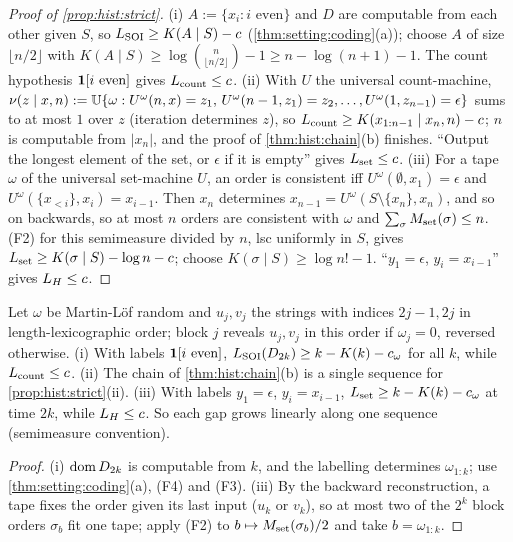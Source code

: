 \begin{proof}[Proof of \cref{prop:hist:strict}]
(i) $A:=\{x_i:i\text{ even}\}$ and $D$ are computable from each other given $S$, so $L_{\mathrm{SOI}}\ge K(A\mid S)-c$ (\cref{thm:setting:coding}(a)); choose $A$ of size $\lfloor n/2\rfloor$ with $K(A\mid S)\ge\log\binom n{\lfloor n/2\rfloor}-1\ge n-\log(n+1)-1$. The count hypothesis $\mathbf{1}[i\text{ even}]$ gives $L_{\rm count}\le c$.
(ii) With $U$ the universal count-machine, $\nu(z\mid x,n):=\mathbb{U}\{\omega:U^\omega(n,x)=z_1,\,U^\omega(n-1,z_1)=z_2,\dots,U^\omega(1,z_{n-1})=\epsilon\}$ sums to at most $1$ over $z$ (iteration determines $z$), so $L_{\rm count}\ge K(x_{1:n-1}\mid x_n,n)-c$; $n$ is computable from $|x_n|$, and the proof of \cref{thm:hist:chain}(b) finishes. ``Output the longest element of the set, or $\epsilon$ if it is empty'' gives $L_{\rm set}\le c$.
(iii) For a tape $\omega$ of the universal set-machine $U$, an order is consistent iff $U^\omega(\emptyset,x_1)=\epsilon$ and $U^\omega(\{x_{<i}\},x_i)=x_{i-1}$. Then $x_n$ determines $x_{n-1}=U^\omega(S\setminus\{x_n\},x_n)$, and so on backwards, so at most $n$ orders are consistent with $\omega$ and $\sum_\sigma M_{\mathrm{set}}(\sigma)\le n$. (F2) for this semimeasure divided by $n$, lsc uniformly in $S$, gives $L_{\rm set}\ge K(\sigma\mid S)-\log n-c$; choose $K(\sigma\mid S)\ge\log n!-1$. ``$y_1=\epsilon$, $y_i=x_{i-1}$'' gives $L_{H}\le c$.
\end{proof}

\begin{proposition}\label{prop:hist:strictinf}
Let $\omega$ be Martin-L\"of random and $u_j,v_j$ the strings with indices $2j-1,2j$ in length-lexicographic order; block $j$ reveals $u_j,v_j$ in this order if $\omega_j=0$, reversed otherwise. (i) With labels $\mathbf{1}[i\text{ even}]$, $L_{\mathrm{SOI}}(D_{2k})\ge k-K(k)-c_\omega$ for all $k$, while $L_{\rm count}\le c$. (ii) The chain of \cref{thm:hist:chain}(b) is a single sequence for \cref{prop:hist:strict}(ii). (iii) With labels $y_1=\epsilon$, $y_i=x_{i-1}$, $L_{\rm set}\ge k-K(k)-c_\omega$ at time $2k$, while $L_{H}\le c$. So each gap grows linearly along one sequence (semimeasure convention).
\end{proposition}

\begin{proof}
(i) $\operatorname{dom} D_{2k}$ is computable from $k$, and the labelling determines $\omega_{1:k}$; use \cref{thm:setting:coding}(a), (F4) and (F3). (iii) By the backward reconstruction, a tape fixes the order given its last input ($u_k$ or $v_k$), so at most two of the $2^k$ block orders $\sigma_b$ fit one tape; apply (F2) to $b\mapsto M_{\mathrm{set}}(\sigma_b)/2$ and take $b=\omega_{1:k}$.
\end{proof}

